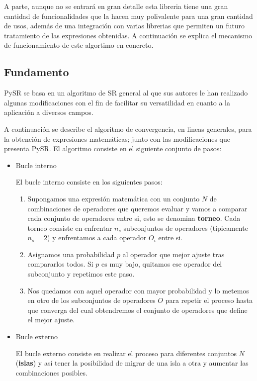 \documentclass[11pt, a4paper]{article} %
\begin{document}
A parte, aunque no se entrará en gran detalle esta libreria tiene
una gran cantidad de funcionalidades que la hacen muy polivalente para una gran cantidad de usos, además de una integración con varias
librerias que permiten un futuro tratamiento de las expresiones obtenidas. A continuación se explica el mecanismo de funcionamiento
de este algortimo en concreto.
\subsection{Fundamento}

PySR se basa en un algoritmo de SR general al que sus autores le han realizado algunas modificaciones con el fin de facilitar
su versatilidad en cuanto a la aplicación a diversos campos. 

A continuación se describe el algoritmo de convergencia, en lineas generales, para la obtención de expresiones matemáticas;
junto con las modificaciones que presenta PySR. El algoritmo
consiste en el siguiente conjunto de pasos:
\begin{itemize}
    \item Bucle interno
    
    El bucle interno consiste en los siguientes pasos:
    \begin{enumerate}
        \item Supongamos una expresión matemática con un conjunto $N$ de combinaciones de operadores que queremos evaluar y vamos
        a comparar cada conjunto de operadores entre si, esto se denomina \textbf{torneo}. Cada torneo consiste en enfrentar
        $n_{s}$ subconjuntos de operadores (tipicamente $n_{s}=2$) y enfrentamos a cada operador $O_{i}$ entre si.
        \item Asignamos una probabilidad $p$ al operador que mejor ajuste tras compararlos todos. Si $p$ es muy bajo, quitamos 
        ese operador del subconjunto y repetimos este paso.
        \item Nos quedamos con aquel operador con mayor probabilidad y lo metemos en otro de los subconjuntos de operadores $O$ 
        para repetir el proceso hasta que converga del cual obtendremos el conjunto de operadores que define el mejor ajuste.
        
    \end{enumerate}
    \item Bucle externo
    
    El bucle externo consiste en realizar el proceso para diferentes conjuntos $N$ (\textbf{islas}) y así tener la posibilidad de migrar
    de una isla a otra y aumentar las combinaciones posibles. 
\end{itemize}
\end{document}
